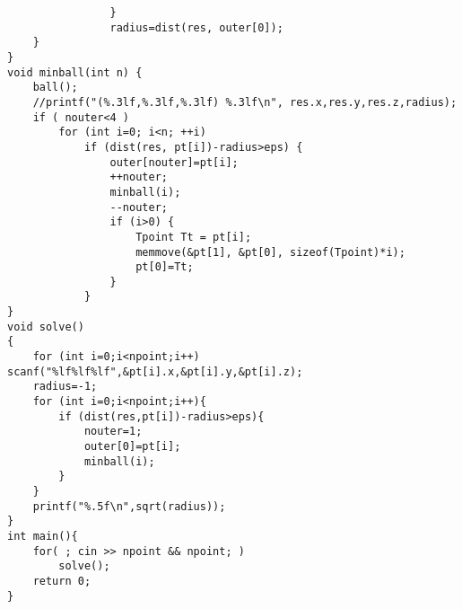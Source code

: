 \begin{lstlisting}
				}
				radius=dist(res, outer[0]);
	}
}
void minball(int n) {
	ball();
	//printf("(%.3lf,%.3lf,%.3lf) %.3lf\n", res.x,res.y,res.z,radius);
	if ( nouter<4 )
		for (int i=0; i<n; ++i)
			if (dist(res, pt[i])-radius>eps) {
				outer[nouter]=pt[i];
				++nouter;
				minball(i);
				--nouter;
				if (i>0) {
					Tpoint Tt = pt[i];
					memmove(&pt[1], &pt[0], sizeof(Tpoint)*i);
					pt[0]=Tt;
				}
			}
}
void solve()
{
	for (int i=0;i<npoint;i++) scanf("%lf%lf%lf",&pt[i].x,&pt[i].y,&pt[i].z);
	radius=-1;
	for (int i=0;i<npoint;i++){
		if (dist(res,pt[i])-radius>eps){
			nouter=1;
			outer[0]=pt[i];
			minball(i);
		}
	}
	printf("%.5f\n",sqrt(radius));
}
int main(){
	for( ; cin >> npoint && npoint; )
		solve();
	return 0;
}
\end{lstlisting}
